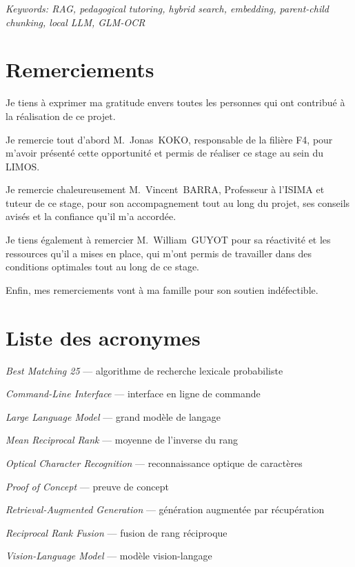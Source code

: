 \documentclass[11pt,a4paper]{article}
\begin{document}
\textit{Keywords: RAG, pedagogical tutoring, hybrid search, embedding, parent-child chunking, local LLM, GLM-OCR}

\section*{Remerciements}

Je tiens à exprimer ma gratitude envers toutes les personnes qui ont contribué à la réalisation de ce projet.

Je remercie tout d'abord M.~Jonas~KOKO, responsable de la filière F4, pour m'avoir présenté cette opportunité et permis de réaliser ce stage au sein du LIMOS.

Je remercie chaleureusement M.~Vincent~BARRA, Professeur à l'ISIMA et tuteur de ce stage, pour son accompagnement tout au long du projet, ses conseils avisés et la confiance qu'il m'a accordée.

Je tiens également à remercier M.~William~GUYOT pour sa réactivité et les ressources qu'il a mises en place, qui m'ont permis de travailler dans des conditions optimales tout au long de ce stage.

Enfin, mes remerciements vont à ma famille pour son soutien indéfectible.

\section*{Liste des acronymes}

\begin{description}[leftmargin=3.5cm,labelwidth=3cm]
  \item[BM25] \textit{Best Matching 25} --- algorithme de recherche lexicale probabiliste
  \item[CLI]  \textit{Command-Line Interface} --- interface en ligne de commande
  \item[LLM]  \textit{Large Language Model} --- grand modèle de langage
  \item[MRR]  \textit{Mean Reciprocal Rank} --- moyenne de l'inverse du rang
  \item[OCR]  \textit{Optical Character Recognition} --- reconnaissance optique de caractères
  \item[POC]  \textit{Proof of Concept} --- preuve de concept
  \item[RAG]  \textit{Retrieval-Augmented Generation} --- génération augmentée par récupération
  \item[RRF]  \textit{Reciprocal Rank Fusion} --- fusion de rang réciproque
  \item[VLM]  \textit{Vision-Language Model} --- modèle vision-langage
\end{description}
\end{document}
